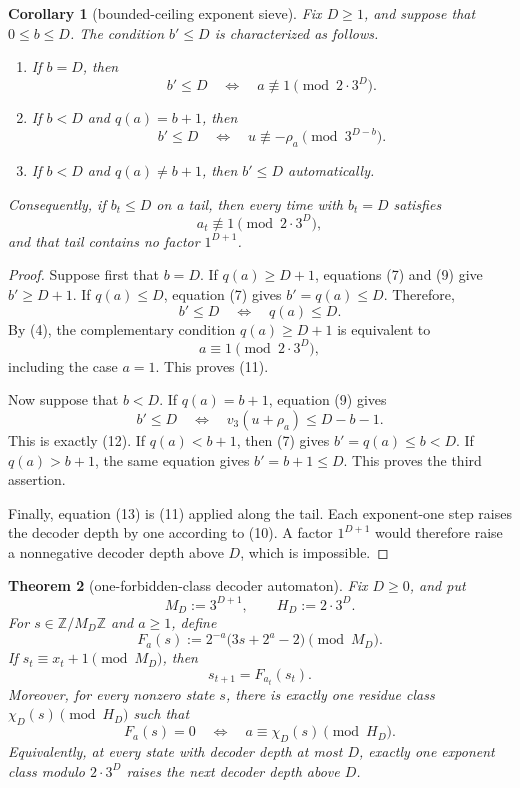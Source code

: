 \documentclass[11pt]{article}
\newtheorem{theorem}{Theorem}
\newtheorem{corollary}[theorem]{Corollary}
\begin{document}
\begin{corollary}[bounded-ceiling exponent sieve]
Fix $D\geq1$, and suppose that $0\leq b\leq D$.  The condition $b'\leq D$
is characterized as follows.

\begin{enumerate}
  \item If $b=D$, then
  \[
  \boxed{
    b'\leq D
    \quad\Longleftrightarrow\quad
    a\not\equiv1\pmod{2\cdot3^D}.}
  \tag{11}
  \]

  \item If $b<D$ and $q(a)=b+1$, then
  \[
  \boxed{
    b'\leq D
    \quad\Longleftrightarrow\quad
    u\not\equiv-\rho_a\pmod{3^{D-b}}.}
  \tag{12}
  \]

  \item If $b<D$ and $q(a)\neq b+1$, then $b'\leq D$ automatically.
\end{enumerate}

Consequently, if $b_t\leq D$ on a tail, then every time with $b_t=D$
satisfies
\[
  a_t\not\equiv1\pmod{2\cdot3^D},
  \tag{13}
\]
and that tail contains no factor $1^{D+1}$.
\end{corollary}

\begin{proof}
Suppose first that $b=D$.  If $q(a)\geq D+1$, equations (7) and (9) give
$b'\geq D+1$.  If $q(a)\leq D$, equation (7) gives $b'=q(a)\leq D$.
Therefore,
\[
  b'\leq D\quad\Longleftrightarrow\quad q(a)\leq D.
  \tag{14}
\]
By (4), the complementary condition $q(a)\geq D+1$ is equivalent to
\[
  a\equiv1\pmod{2\cdot3^D},
\]
including the case $a=1$.  This proves (11).

Now suppose that $b<D$.  If $q(a)=b+1$, equation (9) gives
\[
  b'\leq D
  \quad\Longleftrightarrow\quad
  v_3(u+\rho_a)\leq D-b-1.
\]
This is exactly (12).  If $q(a)<b+1$, then (7) gives $b'=q(a)\leq b<D$.
If $q(a)>b+1$, the same equation gives $b'=b+1\leq D$.  This proves the
third assertion.

Finally, equation (13) is (11) applied along the tail.  Each exponent-one
step raises the decoder depth by one according to (10).  A factor
$1^{D+1}$ would therefore raise a nonnegative decoder depth above $D$,
which is impossible.
\end{proof}

\begin{theorem}[one-forbidden-class decoder automaton]
Fix $D\geq0$, and put
\[
  M_D:=3^{D+1},
  \qquad
  H_D:=2\cdot3^D.
  \tag{15}
\]
For $s\in\mathbb Z/M_D\mathbb Z$ and $a\geq1$, define
\[
  F_a(s):=2^{-a}\bigl(3s+2^a-2\bigr)
  \pmod {M_D}.
  \tag{16}
\]
If $s_t\equiv x_t+1\pmod {M_D}$, then
\[
  s_{t+1}=F_{a_t}(s_t).
  \tag{17}
\]
Moreover, for every nonzero state $s$, there is exactly one residue class
$\chi_D(s)\pmod {H_D}$ such that
\[
\boxed{
  F_a(s)=0
  \quad\Longleftrightarrow\quad
  a\equiv\chi_D(s)\pmod {H_D}.}
\tag{18}
\]
Equivalently, at every state with decoder depth at most $D$, exactly one
exponent class modulo $2\cdot3^D$ raises the next decoder depth above $D$.
\end{theorem}
\end{document}

